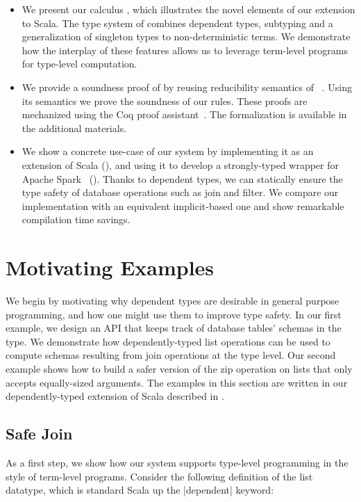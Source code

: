 \begin{itemize}
\item
  We present our calculus \oursystem, which illustrates the novel elements of our extension to Scala.
  The type system of \oursystem combines dependent types, subtyping and a generalization of singleton types to non-deterministic terms.
  We demonstrate how the interplay of these features allows us to leverage term-level programs for type-level computation.
\item
  We provide a soundness proof of \oursystem by reusing reducibility semantics of \FR~\citep{hamza2019system}.
  Using its semantics we prove the soundness of our rules.
  These proofs are mechanized using the Coq proof assistant~\citep{bertot2004interactive}.
  The formalization is available in the additional materials.
\item
  We show a concrete use-case of our system by implementing it as an extension of Scala (), and using it to develop a strongly-typed wrapper for Apache Spark~\citep{zaharia2016apache} ().
  Thanks to dependent types, we can statically ensure the type safety of database operations such as join and filter.
  We compare our implementation with an equivalent implicit-based one and show remarkable compilation time savings.
\end{itemize}

\section{Motivating Examples}
\label{sec:motivating-example}

We begin by motivating why dependent types are desirable in general purpose programming, and how one might use them to improve type safety.
In our first example, we design an API that keeps track of database tables' schemas in the type.
We demonstrate how dependently-typed list operations can be used to compute schemas resulting from join operations at the type level.
Our second example shows how to build a safer version of the zip operation on lists that only accepts equally-sized arguments.
The examples in this section are written in our dependently-typed extension of Scala described in .

\subsection{Safe Join}

As a first step, we show how our system supports type-level programming in the style of term-level programs.
Consider the following definition of the list datatype, which is standard Scala up the |dependent| keyword:

